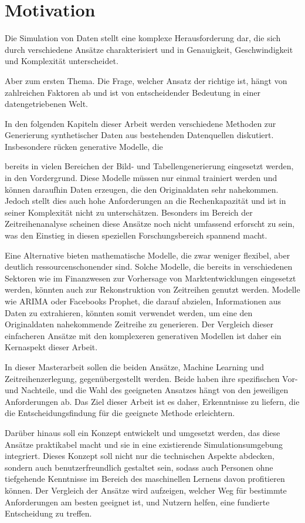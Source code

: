 \section{Motivation}
Die Simulation von Daten stellt eine komplexe Herausforderung dar, die sich durch verschiedene Ansätze charakterisiert und in Genauigkeit, Geschwindigkeit und Komplexität unterscheidet.

Aber zum ersten Thema. Die Frage, welcher Ansatz der richtige ist, hängt von zahlreichen Faktoren ab und ist von entscheidender Bedeutung in einer datengetriebenen Welt.

In den folgenden Kapiteln dieser Arbeit werden verschiedene Methoden zur Generierung synthetischer Daten aus bestehenden Datenquellen diskutiert. Insbesondere rücken generative Modelle, die

bereits in vielen Bereichen der Bild- und Tabellengenerierung eingesetzt werden, in den Vordergrund. Diese Modelle müssen nur einmal trainiert werden und können daraufhin Daten erzeugen, die den Originaldaten sehr nahekommen. 
Jedoch stellt dies auch hohe Anforderungen an die Rechenkapazität und ist in seiner Komplexität nicht zu unterschätzen. Besonders im Bereich der Zeitreihenanalyse scheinen diese Ansätze noch nicht umfassend erforscht zu sein, 
was den Einstieg in diesen speziellen Forschungsbereich spannend macht.

Eine Alternative bieten mathematische Modelle, die zwar weniger flexibel, aber deutlich ressourcenschonender sind. Solche Modelle, die bereits in verschiedenen Sektoren wie im Finanzwesen zur Vorhersage von Marktentwicklungen 
eingesetzt werden, könnten auch zur Rekonstruktion von Zeitreihen genutzt werden. Modelle wie ARIMA oder Facebooks Prophet, die darauf abzielen, Informationen aus Daten zu extrahieren, könnten somit verwendet werden, um eine den 
Originaldaten nahekommende Zeitreihe zu generieren. Der Vergleich dieser einfacheren Ansätze mit den komplexeren generativen Modellen ist daher ein Kernaspekt dieser Arbeit.

In dieser Masterarbeit sollen die beiden Ansätze, Machine Learning und Zeitreihenzerlegung, gegenübergestellt werden. Beide haben ihre spezifischen Vor- und Nachteile, und die Wahl des geeigneten Ansatzes hängt von den jeweiligen 
Anforderungen ab. Das Ziel dieser Arbeit ist es daher, Erkenntnisse zu liefern, die die Entscheidungsfindung für die geeignete Methode erleichtern.

Darüber hinaus soll ein Konzept entwickelt und umgesetzt werden, das diese Ansätze praktikabel macht und sie in eine existierende Simulationsumgebung integriert. Dieses Konzept soll nicht nur die technischen Aspekte abdecken, 
sondern auch benutzerfreundlich gestaltet sein, sodass auch Personen ohne tiefgehende Kenntnisse im Bereich des maschinellen Lernens davon profitieren können. Der Vergleich der Ansätze wird aufzeigen, welcher Weg für bestimmte 
Anforderungen am besten geeignet ist, und Nutzern helfen, eine fundierte Entscheidung zu treffen.

